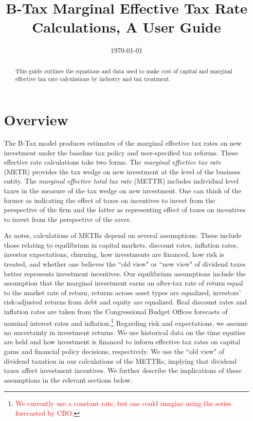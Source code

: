 \documentclass[article,11pt,letterpaper,fleqn]{article}
\title{B-Tax Marginal Effective Tax Rate Calculations, A User Guide}
\date{\today}
\theoremstyle{definition}
\numberwithin{equation}{section}
\newcommand{\cn}{\citeasnoun} %
\begin{document}

\maketitle



\begin{abstract}
This guide outlines the equations and data used to make cost of capital and marginal effective tax rate calculations by industry and tax treatment.
\end{abstract}

\section{Overview}

The B-Tax model produces estimates of the marginal effective tax rates on new investment under the baseline tax policy and user-specified tax reforms.  These effective rate calculations take two forms.  The \emph{marginal effective tax rate} (METR) provides the tax wedge on new investment at the level of the business entity.  The \emph{marginal effective total tax rate} (METTR) includes individual level taxes in the measure of the tax wedge on new investment.  One can think of the former as indicating the effect of taxes on incentives to invest from the perspective of the firm and the latter as representing effect of taxes on incentives to invest from the perspective of the saver.

As \cn{FullertonMETR} notes, calculations of METRs depend on several assumptions.  These include those relating to equilibrium in capital markets. discount rates, inflation rates, investor expectations, churning, how investments are financed, how risk is treated, and whether one believes the ``old view" or ``new view" of dividend taxes better represents investment incentives.  Our equilibrium assumptions include the assumption that the marginal investment earns an after-tax rate of return equal to the market rate of return, returns across asset types are equalized, investors' risk-adjusted returns from debt and equity are equalized.  Real discount rates and inflation rates are taken from the Congressional Budget Offices forecasts of nominal interest rates and inflation.\footnote{\textcolor{red}{We currently use a constant rate, but one could imagine using the series forecasted by CBO.}}  Regarding risk and expectations, we assume no uncertainty in investment returns.  We use historical data on the time equities are held and how investment is financed to inform effective tax rates on capital gains and financial policy decisions, respectively.  We use the ``old view" of dividend taxation in our calculations of the METTRs, implying that dividend taxes affect investment incentives.  We further describe the implications of these assumptions in the relevant sections below.
\end{document}
